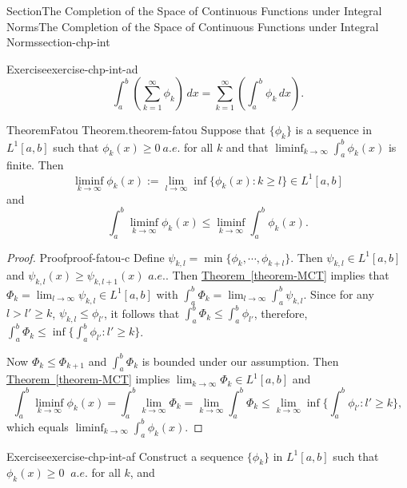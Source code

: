 \documentclass[oneside,10pt,]{article}
\newcommand{\xreffont}{\relax}
\numberwithin{equation}{section}
\begin{document}
\begin{sectionptx}{Section}{The Completion of the Space of Continuous Functions under Integral Norms}{}{The Completion of the Space of Continuous Functions under Integral Norms}{}{}{section-chp-int}
\begin{inlineexercise}{Exercise}{}{exercise-chp-int-ad}
\begin{equation*}
\int_{a}^{b} \left( \sum_{k=1 }^{\infty} \phi_{k}\right)\, dx =
\sum_{k=1 }^{\infty} \left(  \int_{a}^{b} \phi_{k}\, dx\right)\text{.}
\end{equation*}
%
\end{inlineexercise}%
\begin{theorem}{Theorem}{Fatou Theorem.}{}{theorem-fatou}%
Suppose that \(\{\phi_{k}\}\) is a sequence in \(L^{1}[a, b]\) such that \(\phi_{k}(x)\ge 0\)\(\ a.e.\) for all \(k\) and that  \(\liminf_{k\to \infty} \int_{a}^{b} \phi_{k}(x)\) is finite. Then%
\begin{equation*}
\liminf_{k\to \infty} \phi_{k}(x) :=\lim_{l\to \infty} \inf\{\phi_{k}(x): k\ge l\} \in L^{1}[a, b]
\end{equation*}
and%
\begin{equation*}
\int_{a}^{b} \liminf_{k\to \infty} \phi_{k}(x) \le \liminf_{k\to \infty} \int_{a}^{b} \phi_{k}(x).
\end{equation*}
\end{theorem}
\begin{proof}{Proof}{}{proof-fatou-c}
Define \(\psi_{k,l}=\min\{\phi_{k},\cdots, \phi_{k+l}\}\). Then \(\psi_{k,l}\in L^{1}[a, b]\) and \(\psi_{k,l}(x)\ge \psi_{k,l+1}(x)\) \(a.e.\). Then \hyperref[theorem-MCT]{Theorem~{\xreffont\ref{theorem-MCT}}} implies that \(\Phi_{k}=\lim_{l\to\infty} \psi_{k,l} \in L^{1}[a, b]\) with \(\int_{a}^{b} \Phi_{k} = \lim_{l\to\infty}\int_{a}^{b} \psi_{k,l}\). Since for any \(l > l' \ge k\), \(\psi_{k,l} \le \phi_{l'}\), it follows that \(\int_{a}^{b} \Phi_{k}  \le \int_{a}^{b} \phi_{l'}\), therefore, \(\int_{a}^{b} \Phi_{k}  \le  \inf\{ \int_{a}^{b} \phi_{l'}: l'\ge k\}\).%
\par
Now \(\Phi_{k} \le \Phi_{k+1} \) and \(\int_{a}^{b} \Phi_{k} \) is bounded under our assumption. Then \hyperref[theorem-MCT]{Theorem~{\xreffont\ref{theorem-MCT}}} implies \(\lim_{k\to\infty} \Phi_{k} \in L^{1}[a, b]\) and%
\begin{equation*}
\int_{a}^{b}  \liminf_{k\to \infty} \phi_{k}(x)
= \int_{a}^{b} \lim_{k\to\infty}  \Phi_{k} = \lim_{k\to\infty}  \int_{a}^{b}  \Phi_{k} 
\le \lim_{k\to\infty} \inf\{ \int_{a}^{b} \phi_{l'}: l'\ge k\},
\end{equation*}
which equals \(\liminf_{k\to \infty} \int_{a}^{b} \phi_{k}(x)\).%
\end{proof}
\begin{inlineexercise}{Exercise}{}{exercise-chp-int-af}%
Construct a sequence \(\{\phi_{k}\}\) in \(L^{1}[a, b]\) such that \(\phi_{k}(x)\ge 0\) \(\ a.e.\) for all \(k\), and%

\end{inlineexercise}
\end{sectionptx}
\end{document}
